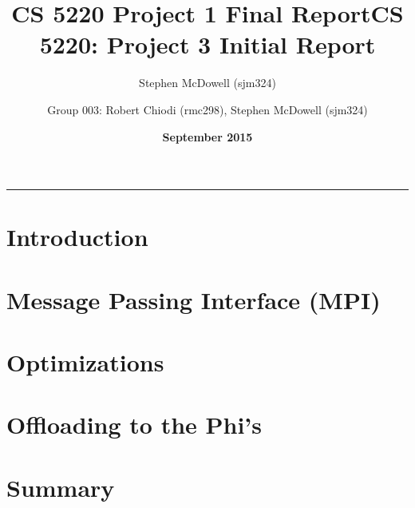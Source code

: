 \documentclass[11pt]{article}
\title{\textbf{CS 5220 Project 1 Final Report}}
\author{Stephen McDowell (sjm324)}
\date{\textbf{September 2015}}
\title{CS 5220: Project 3 Initial Report}
\author{Group 003: Robert Chiodi (rmc298), Stephen McDowell (sjm324)}
\makeatletter
\renewcommand{\maketitle}{\bgroup\setlength{\parindent}{0pt}
\begin{flushleft}
  {\Large \textsc{\@title}}\newline
  \textsc{\@author}
  \rule{\textwidth}{1pt}
\end{flushleft}\egroup
}
\makeatother
\begin{document}
\thispagestyle{empty}
\maketitle

\section{Introduction}

\section{Message Passing Interface (MPI)}

\section{Optimizations}

\section{Offloading to the Phi's}

\section{Summary}
\end{document}
